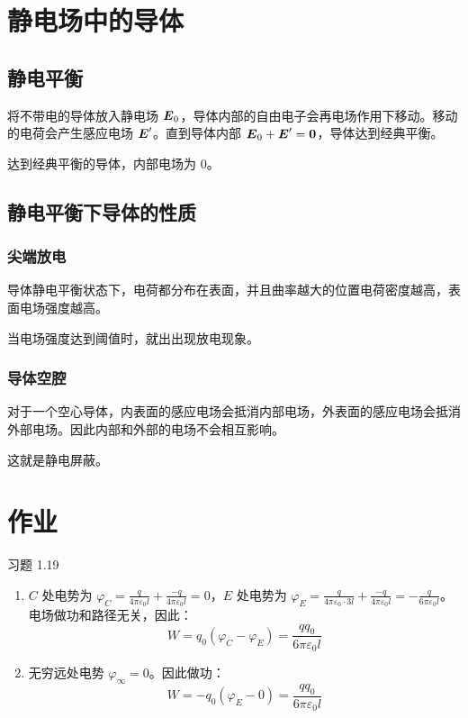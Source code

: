\section{静电场中的导体}

\subsection{静电平衡}

将不带电的导体放入静电场 $\boldsymbol{E}_0$，导体内部的自由电子会再电场作用下移动。移动的电荷会产生感应电场 $\boldsymbol{E}'$。直到导体内部 $\boldsymbol{E}_0 + \boldsymbol{E}' = \boldsymbol{0}$，导体达到经典平衡。

达到经典平衡的导体，内部电场为 $0$。

\subsection{静电平衡下导体的性质}

\subsubsection{尖端放电}

导体静电平衡状态下，电荷都分布在表面，并且曲率越大的位置电荷密度越高，表面电场强度越高。

当电场强度达到阈值时，就出出现放电现象。

\subsubsection{导体空腔}

对于一个空心导体，内表面的感应电场会抵消内部电场，外表面的感应电场会抵消外部电场。因此内部和外部的电场不会相互影响。

这就是静电屏蔽。

\section{作业}

\begin{problem}
	习题 1.19
	\begin{solution}
		\begin{enumerate}
			\item[\textbf{1)}] $C$ 处电势为 $\varphi_C = \frac{q}{4 \pi \varepsilon_0 l} + \frac{-q}{4 \pi \varepsilon_0 l} = 0$，$E$ 处电势为 $\varphi_E = \frac{q}{4 \pi \varepsilon_0 \cdot 3l} + \frac{-q}{4 \pi \varepsilon_0 l} = -\frac{q}{6 \pi \varepsilon_0 l}$。电场做功和路径无关，因此：
			$$
			W = q_0 (\varphi_C - \varphi_E) = \frac{q q_0}{6 \pi \varepsilon_0 l}
			$$

			\item[\textbf{2)}] 无穷远处电势 $\varphi_{\infty} = 0$。因此做功：
			$$
			W = -q_0 (\varphi_E - 0) = \frac{q q_0}{6 \pi \varepsilon_0 l}
			$$
		\end{enumerate}
	\end{solution}
\end{problem}

